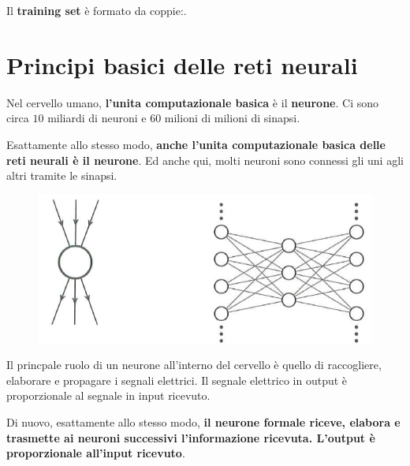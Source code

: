Il \textbf{training set} è formato da coppie:.
\newpage
\section{Principi basici delle reti neurali}
Nel cervello umano, \textbf{l'unita computazionale basica} è il \textbf{neurone}. Ci sono circa $10$ miliardi di neuroni e $60$ milioni di milioni di sinapsi.



Esattamente allo stesso modo, \textbf{anche l'unita computazionale basica delle reti neurali è il neurone}. Ed anche qui, molti neuroni sono connessi gli uni agli altri tramite le sinapsi.
\begin{figure}[!h]
    \includegraphics[scale=1]{images/perceptron/neuron01.png}
    \centering
\end{figure}



Il princpale ruolo di un neurone all'interno del cervello è quello di raccogliere, elaborare e propagare i segnali elettrici.
Il segnale elettrico in output è proporzionale al segnale in input ricevuto.



Di nuovo, esattamente allo stesso modo, \textbf{il neurone formale riceve, elabora e trasmette ai neuroni successivi l'informazione ricevuta. L'output è proporzionale all'input ricevuto}.


